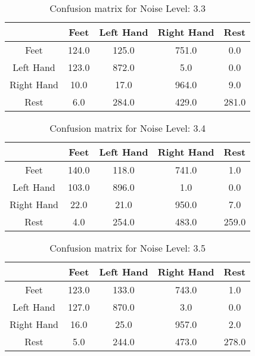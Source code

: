 \begin{table}[!htbp]
    \centering
    \begin{tabular}{|c||c|c|c|c|}
        \hline
		 & Feet & Left Hand & Right Hand & Rest \\
        \hline
        \hline
        Feet & 124.0 & 125.0 & 751.0 & 0.0 \\
        \hline
        Left Hand & 123.0 & 872.0 & 5.0 & 0.0 \\
        \hline
        Right Hand & 10.0 & 17.0 & 964.0 & 9.0 \\
        \hline
        Rest & 6.0 & 284.0 & 429.0 & 281.0 \\
        \hline
    \end{tabular}
    \caption{Confusion matrix for Noise Level: 3.3}
\end{table}

\begin{table}[!htbp]
    \centering
    \begin{tabular}{|c||c|c|c|c|}
        \hline
		 & Feet & Left Hand & Right Hand & Rest \\
        \hline
        \hline
        Feet & 140.0 & 118.0 & 741.0 & 1.0 \\
        \hline
        Left Hand & 103.0 & 896.0 & 1.0 & 0.0 \\
        \hline
        Right Hand & 22.0 & 21.0 & 950.0 & 7.0 \\
        \hline
        Rest & 4.0 & 254.0 & 483.0 & 259.0 \\
        \hline
    \end{tabular}
    \caption{Confusion matrix for Noise Level: 3.4}
\end{table}

\begin{table}[!htbp]
    \centering
    \begin{tabular}{|c||c|c|c|c|}
        \hline
		 & Feet & Left Hand & Right Hand & Rest \\
        \hline
        \hline
        Feet & 123.0 & 133.0 & 743.0 & 1.0 \\
        \hline
        Left Hand & 127.0 & 870.0 & 3.0 & 0.0 \\
        \hline
        Right Hand & 16.0 & 25.0 & 957.0 & 2.0 \\
        \hline
        Rest & 5.0 & 244.0 & 473.0 & 278.0 \\
        \hline
    \end{tabular}
    \caption{Confusion matrix for Noise Level: 3.5}
\end{table}

